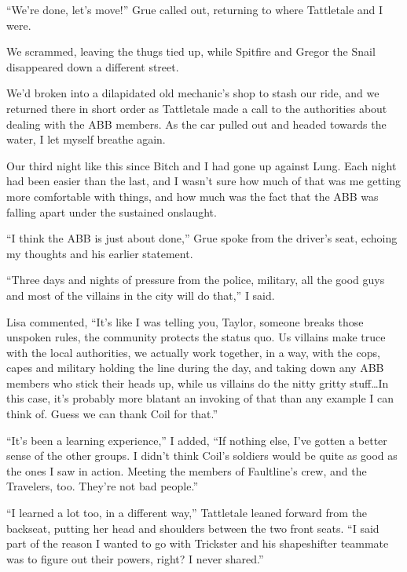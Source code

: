 ``We're done, let's move!'' Grue called out, returning to where Tattletale and I were.



We scrammed, leaving the thugs tied up, while Spitfire and Gregor the Snail disappeared down a different street.



We'd broken into a dilapidated old mechanic's shop to stash our ride, and we returned there in short order as Tattletale made a call to the authorities about dealing with the ABB members.  As the car pulled out and headed towards the water, I let myself breathe again.



Our third night like this since Bitch and I had gone up against Lung.  Each night had been easier than the last, and I wasn't sure how much of that was me getting more comfortable with things, and how much was the fact that the ABB was falling apart under the sustained onslaught.



``I think the ABB is just about done,'' Grue spoke from the driver's seat, echoing my thoughts and his earlier statement.



``Three days and nights of pressure from the police, military, all the good guys and most of the villains in the city will do that,'' I said.



Lisa commented, ``It's like I was telling you, Taylor, someone breaks those unspoken rules, the community protects the status quo.  Us villains make truce with the local authorities, we actually work together, in a way, with the cops, capes and military holding the line during the day, and taking down any ABB members who stick their heads up, while us villains do the nitty gritty stuff\ldots In this case, it's probably more blatant an invoking of that than any example I can think of.  Guess we can thank Coil for that.''



``It's been a learning experience,'' I added, ``If nothing else, I've gotten a better sense of the other groups.  I didn't think Coil's soldiers would be quite as good as the ones I saw in action.  Meeting the members of Faultline's crew, and the Travelers, too.  They're not bad people.''



``I learned a lot too, in a different way,'' Tattletale leaned forward from the backseat, putting her head and shoulders between the two front seats.  ``I said part of the reason I wanted to go with Trickster and his shapeshifter teammate was to figure out their powers, right?  I  never shared.''



